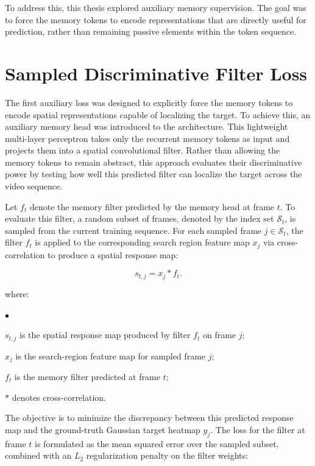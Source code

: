 \documentclass[bachelorthesis]{fer}
\numberwithin{equation}{chapter}
\newcommand{\FormulaNotationWith}[2]{%
    \vspace{-0.6em}
    \noindent\hspace*{1.2em}%
    \begin{minipage}{0.90\textwidth}
        \footnotesize
        #1
        \vspace{0.2em}
        \begin{list}{\(\bullet\)}{
            \setlength{\leftmargin}{1.4em}
            \setlength{\labelwidth}{0.8em}
            \setlength{\labelsep}{0.5em}
            \setlength{\itemsep}{0.05em}
            \setlength{\parsep}{0pt}
            \setlength{\topsep}{0.25em}
            \setlength{\partopsep}{0pt}
        }
            #2
        \end{list}
    \end{minipage}
    \par
    \vspace{0.8em}

}
\newcommand{\FormulaNotation}[1]{\FormulaNotationWith{where:}{#1}}
\begin{document}
    To address this, this thesis explored auxiliary memory supervision. The goal was to force the memory tokens to encode representations that are directly useful for prediction, rather than remaining passive elements within the token sequence.


    \section{Sampled Discriminative Filter Loss}\label{sampled-discriminative-filter-loss}

    The first auxiliary loss was designed to explicitly force the memory tokens to encode spatial representations capable of localizing the target. To achieve this, an auxiliary memory head was introduced to the architecture. This lightweight multi-layer perceptron takes only the recurrent memory tokens as input and projects them into a spatial convolutional filter. Rather than allowing the memory tokens to remain abstract, this approach evaluates their discriminative power by testing how well this predicted filter can localize the target across the video sequence.

    Let \(f_t\) denote the memory filter predicted by the memory head at frame \(t\). To evaluate this filter, a random subset
    of frames, denoted by the index set \(\mathcal{S}_t\), is sampled from the current training sequence. For each sampled
    frame \(j \in \mathcal{S}_t\), the filter \(f_t\) is applied to the corresponding search region feature map \(x_j\) via
    cross-correlation to produce a spatial response map:

    \begin{equation}
        s_{t,j} = x_j * f_t.
    \end{equation}
    \FormulaNotation{
        \item \(s_{t,j}\) is the spatial response map produced by filter \(f_t\) on frame \(j\);
        \item \(x_j\) is the search-region feature map for sampled frame \(j\);
        \item \(f_t\) is the memory filter predicted at frame \(t\);
        \item \(*\) denotes cross-correlation.
    }

    The objective is to minimize the discrepancy between this predicted response map and the ground-truth Gaussian target heatmap \(y_j\). The loss for the filter at frame \(t\) is formulated as the mean squared error over the sampled subset, combined with an \(L_2\) regularization penalty on the filter weights:
\end{document}
